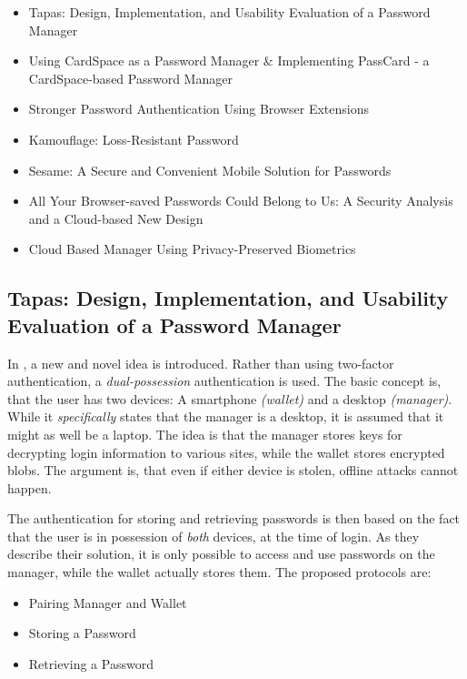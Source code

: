 		\begin{itemize}
			\item Tapas: Design, Implementation, and Usability Evaluation of a Password Manager \cite{tapas}
			\item Using CardSpace as a Password Manager \& Implementing PassCard - a CardSpace-based Password Manager \cite{cardspace,cardspace_impl}
			\item Stronger Password Authentication Using Browser Extensions
			\item Kamouflage: Loss-Resistant Password
			\item Sesame: A Secure and Convenient Mobile Solution for Passwords
			\item All Your Browser-saved Passwords Could Belong to Us: A Security Analysis and a Cloud-based New Design
			\item Cloud Based Manager Using Privacy-Preserved Biometrics
		\end{itemize}
		

		\subsection*{Tapas: Design, Implementation, and Usability Evaluation of a Password Manager}
			In \cite{tapas}, a new and novel idea is introduced. Rather than using two-factor authentication, a \emph{dual-possession} authentication is used. The basic concept is, that the user has two devices: A smartphone \emph{(wallet)} and a desktop \emph{(manager)}. While it \emph{specifically} states that the manager is a desktop, it is assumed that it might as well be a laptop. The idea is that the manager stores keys for decrypting login information to various sites, while the wallet stores encrypted blobs. The argument is, that even if either device is stolen, offline attacks cannot happen.

			The authentication for storing and retrieving passwords is then based on the fact that the user is in possession of \emph{both} devices, at the time of login. As they describe their solution, it is only possible to access and use passwords on the manager, while the wallet actually stores them. The proposed protocols are:
			\begin{itemize}
				\item Pairing Manager and Wallet
				\item Storing a Password
				\item Retrieving a Password
			\end{itemize}


